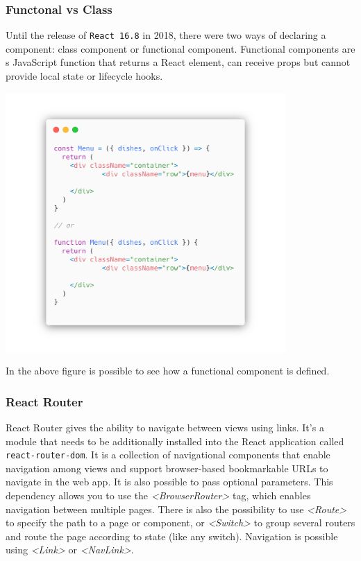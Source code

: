 \subsubsection*{Functonal vs Class}
Until the release of \texttt{React 16.8} in 2018, there were two ways of declaring a component: class component or functional component. Functional components are s JavaScript function that returns a React element, can receive props but cannot provide local state or lifecycle hooks. 
\begin{center}
    \includegraphics[width=0.8\textwidth]{assets/class-vs-functional.png}
\end{center}

In the above figure is possible to see how a functional component is defined.


\subsubsection*{React Router}
React Router gives the ability to navigate between views using links. It's a module that needs to be additionally installed into the React application called \texttt{react-router-dom}. It is a collection of navigational components that enable navigation among views and support browser-based bookmarkable URLs to navigate in the web app. It is also possible to pass optional parameters.
This dependency allows you to use the \textit{<BrowserRouter>} tag, which enables navigation between multiple pages.
There is also the possibility to use \textit{<Route>} to specify the path to a page or component, or \textit{<Switch>} to group several routers and route the page according to state (like any switch).
Navigation is possible using \textit{<Link>} or \textit{<NavLink>}.

